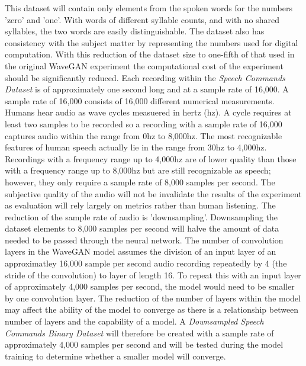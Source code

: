 \documentclass[a4paper, dvipsnames, titlepage]{article}
\begin{document}
This dataset will contain only elements from the spoken words for the numbers 'zero' and 'one'.
With words of different syllable counts, and with no shared syllables, the two words are easily distinguishable.
The dataset also has consistency with the subject matter by representing the numbers used for digital computation.
With this reduction of the dataset size to one-fifth of that used in the original WaveGAN experiment the computational cost of the experiment should be significantly reduced.
\newline
\newline
Each recording within the \textit{Speech Commands Dataset} is of approximately one second long and at a sample rate of 16,000.
A sample rate of 16,000 consists of 16,000 different numerical measurements.
Humans hear audio as wave cycles measuered in hertz (hz).
A cycle requires at least two samples to be recorded so a recording with a sample rate of 16,000 captures audio within the range from 0hz to 8,000hz.
The most recognizable features of human speech actually lie in the range from 30hz to 4,000hz.
Recordings with a frequency range up to 4,000hz are of lower quality than those with a frequency range up to 8,000hz but are still recognizable as speech; however, they only require a sample rate of 8,000 samples per second.
The subjective quality of the audio will not be invalidate the results of the experiment as evaluation will rely largely on metrics rather than human listening.
\newline
\newline
The reduction of the sample rate of audio is 'downsampling'.
Downsampling the dataset elements to 8,000 samples per second will halve the amount of data needed to be passed through the neural network.
The number of convolution layers in the WaveGAN model assumes the division of an input layer of an approximatley 16,000 sample per second audio recording repeatedly by 4 (the stride of the convolution) to layer of length 16.
To repeat this with an input layer of approximately 4,000 samples per second, the model would need to be smaller by one convolution layer.
The reduction of the number of layers within the model may affect the ability of the model to converge as there is a relationship between number of layers and the capability of a model.
\newline
\newline
A \textit{Downsampled Speech Commands Binary Dataset} will therefore be created with a sample rate of approximately 4,000 samples per second and will be tested during the model training to determine whether a smaller model will converge.
\end{document}
